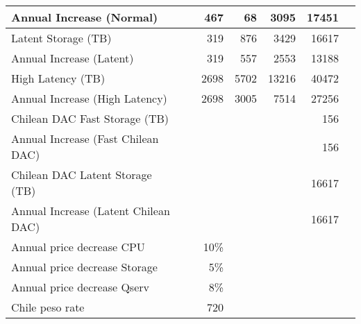 \begin{longtable} { |p{}  |r  |r  |r  |r  |r  |r |}
{Annual Increase (Normal)}&{}&{467}&{68}&{3095}&{17451} \\ \hline
{Latent Storage  (TB)}&{}&{319}&{876}&{3429}&{16617} \\ \hline
{Annual Increase (Latent)}&{}&{319}&{557}&{2553}&{13188} \\ \hline
{High Latency (TB)}&{}&{2698}&{5702}&{13216}&{40472} \\ \hline
{Annual Increase (High Latency)}&{}&{2698}&{3005}&{7514}&{27256} \\ \hline
{Chilean DAC Fast Storage (TB)}&{}&{}&{}&{}&{156} \\ \hline
{Annual Increase (Fast Chilean DAC)}&{}&{}&{}&{}&{156} \\ \hline
{Chilean DAC Latent Storage (TB)}&{}&{}&{}&{}&{16617} \\ \hline
{Annual Increase (Latent Chilean DAC)}&{}&{}&{}&{}&{16617} \\ \hline
{Annual price decrease CPU}&{}&{10\%}&{}&{}&{} \\ \hline
{Annual price decrease Storage}&{}&{5\%}&{}&{}&{} \\ \hline
{Annual price decrease Qserv}&{}&{8\%}&{}&{}&{} \\ \hline
{Chile peso rate }&{}&{720}&&& \\ \hline
\end{longtable} \normalsize
